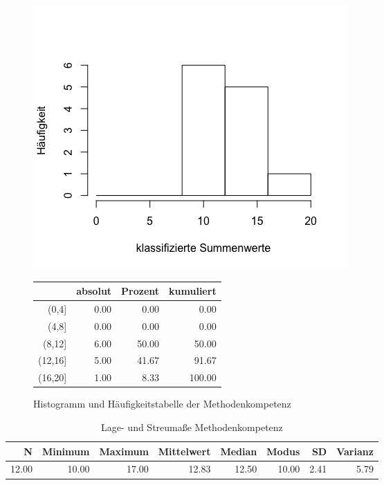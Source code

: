 \documentclass[12pt, bibliography=totoc]{scrartcl}
\begin{document}
\begin{figure}[H]
\begin{minipage}{.5\linewidth}
\includegraphics[width=1.0\linewidth]{Anhang/MKHistn.png}

\label{pic:aufbau}
\end{minipage}
\begin{minipage}{.5\linewidth}
\centering
\raisebox{\depth}
{\begin{tabular}{rrrr}
  \hline
 & absolut & Prozent & kumuliert \\ 
  \hline
(0,4] & 0.00 & 0.00 & 0.00 \\ 
  (4,8] & 0.00 & 0.00 & 0.00 \\ 
  (8,12] & 6.00 & 50.00 & 50.00 \\ 
  (12,16] & 5.00 & 41.67 & 91.67 \\ 
  (16,20] & 1.00 & 8.33 & 100.00 \\ 
   \hline
\end{tabular}

}
\label{tab:defis}
\end{minipage}
\caption{Histogramm und Häufigkeitstabelle der Methodenkompetenz}
\end{figure}

\begin{table}[H]
\centering
\caption{Lage- und Streumaße Methodenkompetenz}
\begin{tabular}{rrrrrrrr}
  \hline
  N & Minimum & Maximum & Mittelwert & Median & Modus & SD & Varianz \\
  \hline
  12.00 & 10.00 & 17.00 & 12.83 & 12.50 & 10.00 & 2.41 & 5.79 \\
   \hline
\end{tabular}
\end{table}
\end{document}
